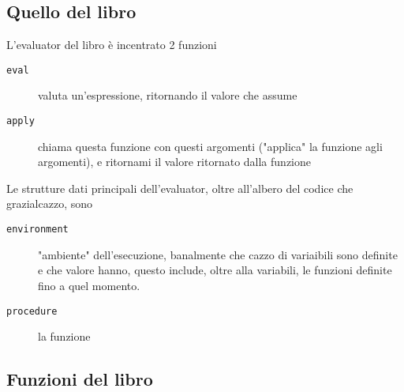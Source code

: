 \documentclass[11pt]{article}
\begin{document}
\subsection{Quello del libro}
\label{sec:orgccd1639}
L'evaluator del libro è incentrato 2 funzioni
\begin{description}
\item[{\texttt{eval}}] valuta un'espressione, ritornando il valore che assume
\item[{\texttt{apply}}] chiama questa funzione con questi argomenti ("applica" la funzione agli argomenti), e ritornami il valore ritornato dalla funzione
\end{description}

Le strutture dati principali dell'evaluator, oltre all'albero del codice che grazialcazzo, sono
\begin{description}
\item[{\texttt{environment}}] "ambiente" dell'esecuzione, banalmente che cazzo di variaibili sono definite e che valore hanno, questo include, oltre alla variabili, le funzioni definite fino a quel momento.
\item[{\texttt{procedure}}] la funzione
\end{description}

\subsection{Funzioni del libro}
\label{sec:org9897c61}
\end{document}

